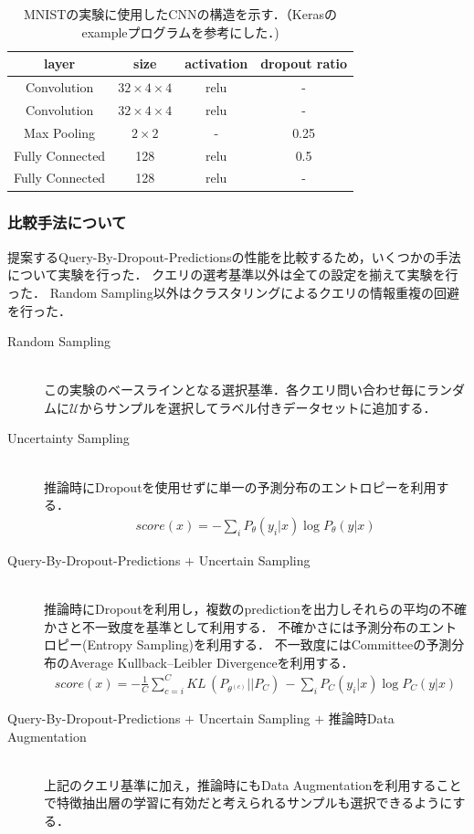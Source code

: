 \begin{table}[h]
    
    \caption{\label{table:mnist_cnn}MNISTの実験に使用したCNNの構造を示す．（Kerasのexampleプログラムを参考にした．)}
    \center
    \begin{tabular}{|c|c|c|c|} \hline
        layer & size & activation & dropout ratio\\ \hline
        Convolution & $32 \times 4 \times 4$ & relu & - \\
        Convolution & $32 \times 4 \times 4$ & relu & - \\
        Max Pooling & $2 \times 2$ & - & 0.25  \\ 
        Fully Connected & 128 & relu & 0.5 \\
        Fully Connected & 128 & relu & - \\
        \hline
    \end{tabular}
\end{table}

\subsubsection{比較手法について}
提案するQuery-By-Dropout-Predictionsの性能を比較するため，いくつかの手法について実験を行った．
クエリの選考基準以外は全ての設定を揃えて実験を行った．
Random Sampling以外はクラスタリングによるクエリの情報重複の回避を行った．

\begin{description}
    \item[Random Sampling]\mbox{}\\
        この実験のベースラインとなる選択基準．各クエリ問い合わせ毎にランダムに$\mathcal{U}$からサンプルを選択してラベル付きデータセットに追加する．
    \item[Uncertainty Sampling]\mbox{}\\
        推論時にDropoutを使用せずに単一の予測分布のエントロピーを利用する．
        \begin{eqnarray}
            score(x) =  - \sum_i {P_{\theta}(y_i|x)} \log P_{\theta}(y|x)
        \end{eqnarray}
    \item[Query-By-Dropout-Predictions $+$ Uncertain Sampling]\mbox{}\\ 
        推論時にDropoutを利用し，複数のpredictionを出力しそれらの平均の不確かさと不一致度を基準として利用する．
        不確かさには予測分布のエントロピー(Entropy Sampling)を利用する．
        不一致度にはCommitteeの予測分布のAverage Kullback–Leibler Divergenceを利用する．
        \begin{eqnarray}
            score(x) =  -  \frac{1}{C} \sum_{c=i}^C KL \, (P_{\theta^{(c)}} || P_C) \, - \sum_i {P_C(y_i|x)} \log P_C(y|x)
        \end{eqnarray}
    \item[Query-By-Dropout-Predictions $+$ Uncertain Sampling $+$ 推論時Data Augmentation]\mbox{}\\
        上記のクエリ基準に加え，推論時にもData Augmentationを利用することで特徴抽出層の学習に有効だと考えられるサンプルも選択できるようにする．
\end{description}


